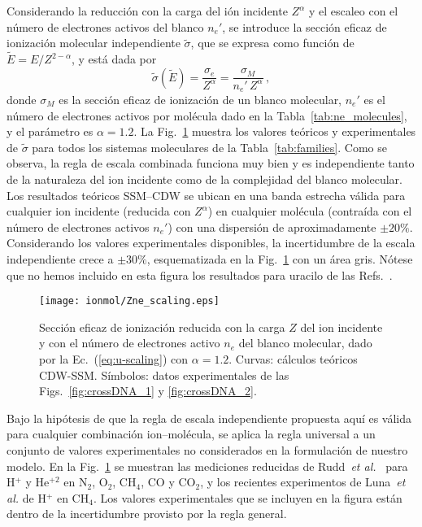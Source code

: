 Considerando la reducción con la carga del ión incidente $Z^\alpha$ y 
el escaleo con el número de electrones activos del blanco $n_e'$, se 
introduce la sección eficaz de ionización molecular independiente 
$\tilde{\sigma}$, que se expresa como función de 
$\tilde{E}=E/Z^{2-\alpha}$, y está dada por 
\begin{equation}
\tilde{\sigma}\left(\tilde{E}\right)=\frac{\sigma_e}{Z^{\alpha}}
=\frac{\sigma_M}{n_e'\,Z^{\alpha}}\,,
\label{eq:u-scaling}
\end{equation}
donde $\sigma_M$ es la sección eficaz de ionización de un blanco 
molecular, $n_e'$ es el número de electrones activos por molécula dado
en la Tabla~\ref{tab:ne_molecules}, y el parámetro es $\alpha=1.2$. La 
Fig.~\ref{fig:zalpha} muestra los valores teóricos y experimentales de 
$\tilde{\sigma}$ para todos los sistemas moleculares de la 
Tabla~\ref{tab:families}. Como se observa, la regla de escala combinada 
funciona muy bien y es independiente tanto de la naturaleza del ion 
incidente como de la complejidad del blanco molecular. Los resultados 
teóricos SSM--CDW se ubican en una banda estrecha válida para cualquier 
ion incidente (reducida con $Z^\alpha$) en cualquier molécula (contraída 
con el número de electrones activos $n_e'$) con una dispersión de 
aproximadamente $\pm 20\%$. Considerando los valores experimentales 
disponibles, la incertidumbre de la escala independiente crece a 
$\pm 30\%$, esquematizada en la Fig.~\ref{fig:zalpha} con un área 
gris. Nótese que no hemos incluido en esta figura los resultados para 
uracilo de las Refs.~\cite{agnihotri2012,agnihotri2013}. 

\begin{figure}[t]
\centering
\texttt{[image: ionmol/Zne\_scaling.eps]}
\caption[Sección eficaz de ionización reducida por $Z$ y $n_e$.]
{Sección eficaz de ionización reducida con la carga $Z$ del ion 
incidente y con el número de electrones activo $n_e$ del blanco 
molecular, dado por la Ec.~(\ref{eq:u-scaling}) con $\alpha=1.2$. 
Curvas: cálculos teóricos CDW-SSM. Símbolos: datos experimentales de 
las Figs.~\ref{fig:crossDNA_1} y \ref{fig:crossDNA_2}.}
\label{fig:zalpha}
\end{figure} 

Bajo la hipótesis de que la regla de escala independiente propuesta aquí 
es válida para cualquier combinación ion--molécula, se aplica la regla 
universal a un conjunto de valores experimentales no considerados en la
formulación de nuestro modelo. En la Fig.~\ref{fig:zalpha} se muestran 
las mediciones reducidas de Rudd~\textit{et al.}~\cite{Rudd:85,Rudd:83} 
para H$^{+}$ y He$^{+2}$ en N$_2$, O$_2$, CH$_4$, CO y CO$_2$, y los 
recientes experimentos de Luna~\textit{et al.} \cite{Luna2019} de 
H$^{+}$ en CH$_4$. Los valores experimentales que se incluyen en la 
figura están dentro de la incertidumbre provisto por la regla general.

